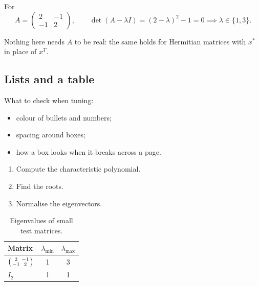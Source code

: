 \documentclass[11pt]{article}
\begin{document}
\begin{example}
For
\[
  A = \begin{pmatrix} 2 & -1 \\ -1 & 2 \end{pmatrix}, \qquad
  \det(A - \lambda I) = (2-\lambda)^{2} - 1 = 0 \implies \lambda \in \{1, 3\}.
\]
\end{example}

\begin{remark}
Nothing here needs $A$ to be real: the same holds for Hermitian matrices with
$x^{*}$ in place of $x^{T}$.
\end{remark}

\subsection{Lists and a table}

What to check when tuning:
\begin{itemize}
  \item colour of bullets and numbers;
  \item spacing around boxes;
  \item how a box looks when it breaks across a page.
\end{itemize}

\begin{enumerate}
  \item Compute the characteristic polynomial.
  \item Find the roots.
  \item Normalise the eigenvectors.
\end{enumerate}

\begin{table}[h]
  \centering
  \caption{Eigenvalues of small test matrices.}
  \begin{tabular}{lcc}
    \toprule
    Matrix & $\lambda_{\min}$ & $\lambda_{\max}$ \\
    \midrule
    $\begin{psmallmatrix} 2 & -1 \\ -1 & 2 \end{psmallmatrix}$ & 1 & 3 \\
    $I_2$ & 1 & 1 \\
    \bottomrule
  \end{tabular}
\end{table}
\end{document}
